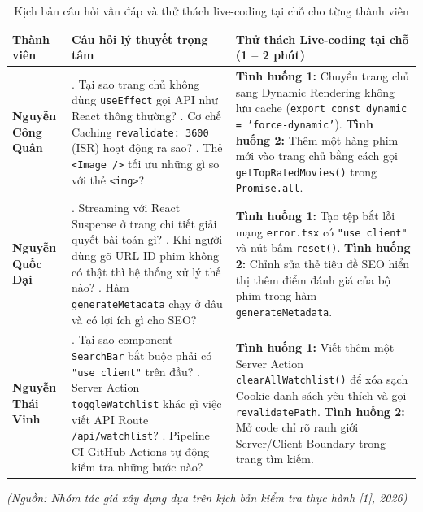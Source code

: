 \documentclass[13pt,a4paper]{extarticle}
\begin{document}
\begin{table}[H]
\centering
\caption{Kịch bản câu hỏi vấn đáp và thử thách live-coding tại chỗ cho từng thành viên}
\label{tab:viva_scenarios}
\begin{tabularx}{\textwidth}{>{\raggedright\arraybackslash}p{2.6cm}>{\raggedright\arraybackslash}p{5.5cm}>{\raggedright\arraybackslash}X}
\toprule
\textbf{Thành viên} & \textbf{Câu hỏi lý thuyết trọng tâm} & \textbf{Thử thách Live-coding tại chỗ (1 -- 2 phút)} \\
\midrule
\textbf{Nguyễn Công Quân} & 
1. Tại sao trang chủ không dùng \texttt{useEffect} gọi API như React thông thường? \newline
2. Cơ chế Caching \texttt{revalidate: 3600} (ISR) hoạt động ra sao? \newline
3. Thẻ \texttt{<Image />} tối ưu những gì so với thẻ \texttt{<img>}? & 
\textbf{Tình huống 1:} Chuyển trang chủ sang Dynamic Rendering không lưu cache (\texttt{export const dynamic = 'force-dynamic'}). \newline
\textbf{Tình huống 2:} Thêm một hàng phim mới vào trang chủ bằng cách gọi \texttt{getTopRatedMovies()} trong \texttt{Promise.all}. \\
\midrule
\textbf{Nguyễn Quốc Đại} & 
1. Streaming với React Suspense ở trang chi tiết giải quyết bài toán gì? \newline
2. Khi người dùng gõ URL ID phim không có thật thì hệ thống xử lý thế nào? \newline
3. Hàm \texttt{generateMetadata} chạy ở đâu và có lợi ích gì cho SEO? & 
\textbf{Tình huống 1:} Tạo tệp bắt lỗi mạng \texttt{error.tsx} có \texttt{"use client"} và nút bấm \texttt{reset()}. \newline
\textbf{Tình huống 2:} Chỉnh sửa thẻ tiêu đề SEO hiển thị thêm điểm đánh giá của bộ phim trong hàm \texttt{generateMetadata}. \\
\midrule
\textbf{Nguyễn Thái Vinh} & 
1. Tại sao component \texttt{SearchBar} bắt buộc phải có \texttt{"use client"} trên đầu? \newline
2. Server Action \texttt{toggleWatchlist} khác gì việc viết API Route \texttt{/api/watchlist}? \newline
3. Pipeline CI GitHub Actions tự động kiểm tra những bước nào? & 
\textbf{Tình huống 1:} Viết thêm một Server Action \texttt{clearAllWatchlist()} để xóa sạch Cookie danh sách yêu thích và gọi \texttt{revalidatePath}. \newline
\textbf{Tình huống 2:} Mở code chỉ rõ ranh giới Server/Client Boundary trong trang tìm kiếm. \\
\bottomrule
\end{tabularx}
\end{table}
\begin{flushleft}\small\textit{(Nguồn: Nhóm tác giả xây dựng dựa trên kịch bản kiểm tra thực hành [1], 2026)}\end{flushleft}
\end{document}
